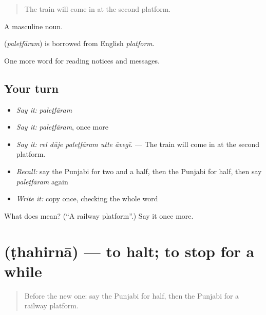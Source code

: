 \begin{quote}
The train will come in at the second platform.
\end{quote}

A masculine noun.

\begin{cousinweb}
\textbf{} (\emph{paleṭfāram}) is borrowed from English \emph{platform}.
\end{cousinweb}

\begin{grammarlens}[title={What you've built}]
One more word for reading notices and messages.
\end{grammarlens}

\subsection*{Your turn}
\begin{itemize}
\raggedright
  \item \emph{Say it:} \emph{paleṭfāram}
  \item \emph{Say it:} \emph{paleṭfāram}, once more
  \item \emph{Say it:} \emph{rel dūje paleṭfāram utte āvegī.} — The train will come in at the second platform.
  \item \emph{Recall:} say the Punjabi for two and a half, then the Punjabi for half, then say \emph{paleṭfāram} again
  \item \emph{Write it:} copy \textbf{} once, checking the whole word
\end{itemize}

\begin{tcolorbox}[breakable,colback=teal!4,colframe=teal!35!black,title={Before you move on}]
What does  mean? (\textquotedblleft{}A railway platform\textquotedblright{}.) Say it once more.
\end{tcolorbox}
\section[\texorpdfstring{\pa{ਠਹਿਰਨਾ} (ṭhahirnā)}{ਠਹਿਰਨਾ (ṭhahirnā)}]{ (ṭhahirnā) — to halt; to stop for a while}

\label{lesson:PA-C261-thahirna}



\begin{quote}
Before the new one: say the Punjabi for half, then the Punjabi for a railway platform.
\end{quote}

